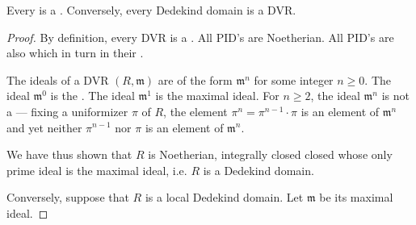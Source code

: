 \begin{proposition} \label{proposition:dvrs_are_dedekind_domains}
    Every  is a . Conversely, every  Dedekind domain is a DVR. 
\end{proposition}
\begin{proof}
    By definition, every DVR is a . All PID's are Noetherian. All PID's are also  which  in turn  in their .  

    The ideals of a DVR $(R, \mathfrak{m})$ are of the form $\mathfrak{m}^n$ for some integer $n \geq 0$. The ideal $\mathfrak{m}^0$ is the . The ideal $\mathfrak{m}^1$ is the maximal ideal. For $n \geq 2$, the ideal $\mathfrak{m}^n$ is not a  --- fixing a uniformizer $\pi$ of $R$, the element $\pi^n = \pi^{n-1} \cdot \pi$ is an element of $\mathfrak{m}^n$ and yet neither $\pi^{n-1}$ nor $\pi$ is an element of $\mathfrak{m}^n$. 
    
    We have thus shown that $R$ is Noetherian, integrally closed closed whose only prime ideal is the maximal ideal, i.e. $R$ is a Dedekind domain. 

    Conversely, suppose that $R$ is a local Dedekind domain. Let $\mathfrak{m}$ be its maximal ideal. 
    


\end{proof}
